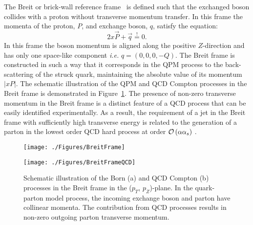 The Breit or brick-wall reference frame~\cite{feynman:1972:photon,zfp:c2:237} is defined such that the exchanged boson collides with a proton without transverse momentum transfer. In this frame the momenta of the proton, $P$, and exchange boson, $q$, satisfy the equation:
\begin{equation}
2x\vec{P} + \vec{q} \stackrel{!}{=} 0.
\label{eq:breitframe}
\end{equation}
In this frame the boson momentum is aligned along the positive $Z$-direction and has only one space-like component \textit{i.e.} $q=\left( 0, 0, 0, -Q\right)$. The Breit frame is constructed in such a way that it corresponds in the QPM process to the back-scattering of the struck quark, maintaining the absolute value of its momentum $\left|xP\right|$. The schematic illustration of the QPM and QCD Compton processes in the Breit frame is demonstrated in Figure~\ref{fig:breitframe}. The presence of non-zero transverse momentum in the Breit frame is a distinct feature of a QCD process that can be easily identified experimentally. As a result, the requirement of a jet in the Breit frame with sufficiently high transverse energy is related to the generation of a parton in the lowest order QCD hard process at order $\mathcal{O}\left(\alpha\mbox{$\alpha_{s}$}\right)$ .
\begin{figure}
	\centering
	\begin{subfloat}[]{
		\texttt{[image: ./Figures/BreitFrame]}
		\label{fig:breitframeqpm}
	}%
	\end{subfloat}
	\begin{subfloat}[]{
		\texttt{[image: ./Figures/BreitFrameQCD]}
		\label{fig:breitframeqcd}
	}%
	\end{subfloat}
	\caption{Schematic illustration of the Born (a) and QCD Compton (b) processes in the Breit frame in the ($p_T$, $p_Z$)-plane. In the quark-parton model process, the incoming exchange boson and parton have collinear momenta. The contribution from QCD processes results in non-zero outgoing parton transverse momentum.}
\label{fig:breitframe}
\end{figure}
